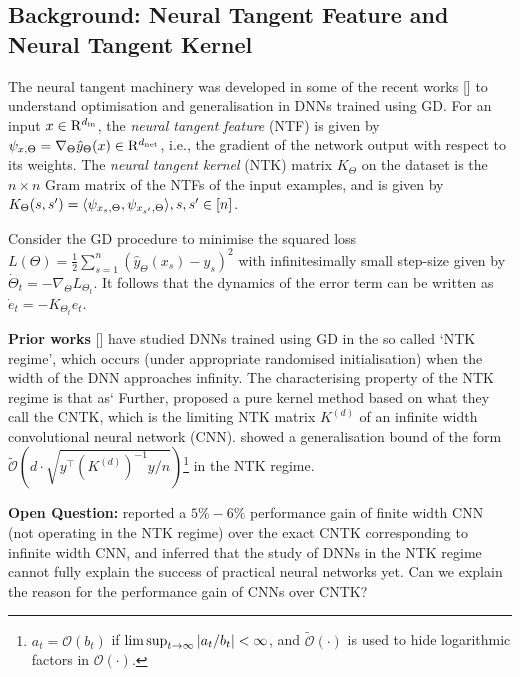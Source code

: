 \documentclass{article}
\begin{document}
\subsection{Background: Neural Tangent Feature and Neural Tangent Kernel}\label{sec:background}
The neural tangent machinery was developed in some of the recent works [] to understand optimisation and generalisation in DNNs trained using GD. For an input $x\in\mathrm{R}^{d_{\text{in}}}$, the \emph{neural tangent feature} (NTF) is given by $\psi_{x,\Theta}=\nabla_{\Theta}\hat{y}_{\Theta}(x)\in\mathrm{R}^{d_{\text{net}}}$, i.e.,  the gradient of the network output with respect to its weights. The \emph{neural tangent kernel} (NTK) matrix $K_{\Theta}$ on the dataset is the $n\times n$ Gram matrix of the NTFs of the input examples, and is given by $K_{\Theta}(s,s')=\langle \psi_{x_s,\Theta},\psi_{x_{s'},\Theta}\rangle, s,s'\in[n]$. 
\begin{proposition}\label{prop:basic}
Consider the GD procedure to minimise the  squared loss $L(\Theta)=\frac{1}{2}\sum_{s=1}^n \left(\hat{y}_{\Theta}(x_s)-y_s\right)^2$ with infinitesimally small step-size given by $\dot{\Theta}_t=-\nabla_{\Theta}L_{\Theta_t}$. It follows that the dynamics of the error term can be written as $\dot{e}_t=-K_{\Theta_t} e_t$. 
\end{proposition}

\textbf{Prior works} [] have studied DNNs trained using GD in the so called `NTK regime', which occurs (under appropriate randomised initialisation) when the width of the DNN approaches infinity. The characterising property of the NTK regime is that as` Further, \cite{arora2019exact} proposed a pure kernel method based on what they call the CNTK, which is the limiting NTK matrix $K^{(d)}$ of an infinite width convolutional neural network (CNN). \cite{cao2019generalization} showed a generalisation bound of the form $\tilde{\mathcal{O}}\left(d\cdot\sqrt{y^\top {\left(K^{(d)}\right)}^{-1} y/n}\right)$\footnote{$a_t=\mathcal{O}(b_t)$ if $\lim\sup_{t\rightarrow\infty}|a_t/b_t|<\infty$, and $\tilde{\mathcal{O}}(\cdot)$ is used to hide logarithmic factors in $\mathcal{O}(\cdot)$.} in the NTK regime. 

\textbf{Open Question:} \cite{arora2019exact} reported a $5\% - 6\%$ performance gain of finite width CNN (not operating in the NTK regime) over the exact CNTK corresponding to infinite width CNN, and inferred that the study of DNNs in the NTK regime cannot fully explain the success of practical neural networks yet. Can we explain the reason for the performance gain of CNNs over CNTK?
\end{document}
